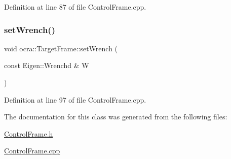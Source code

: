 Definition at line 87 of file Control\+Frame.\+cpp.

\hypertarget{classocra_1_1TargetFrame_a3d8e094de52e69b626322b6cce57d23e}{}\label{classocra_1_1TargetFrame_a3d8e094de52e69b626322b6cce57d23e} 
\subsubsection{\texorpdfstring{set\+Wrench()}{setWrench()}}
{\footnotesize\ttfamily void ocra\+::\+Target\+Frame\+::set\+Wrench (\begin{DoxyParamCaption}\item[{const Eigen\+::\+Wrenchd \&}]{W }\end{DoxyParamCaption})}



Definition at line 97 of file Control\+Frame.\+cpp.



The documentation for this class was generated from the following files\+:\begin{DoxyCompactItemize}
\item 
\hyperlink{ControlFrame_8h}{Control\+Frame.\+h}\item 
\hyperlink{ControlFrame_8cpp}{Control\+Frame.\+cpp}\end{DoxyCompactItemize}
